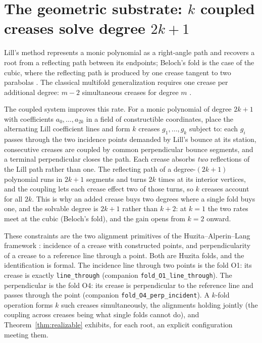 \documentclass[11pt]{amsart}
\theoremstyle{plain}
\theoremstyle{definition}
\newcommand{\code}[1]{\texttt{#1}}
\begin{document}
\section{The geometric substrate: $k$ coupled creases solve degree $2k+1$}\label{sec:geom}

Lill's method represents a monic polynomial as a right-angle path and recovers a root from a reflecting path between its endpoints; Beloch's fold is the case of the cubic, where the reflecting path is produced by one crease tangent to two parabolas \cite{hull}. The classical multifold generalization requires one crease per additional degree: $m-2$ simultaneous creases for degree $m$ \cite{alperinlang, lucero}.

The coupled system improves this rate. For a monic polynomial of degree $2k+1$ with coefficients $a_0,\dots,a_{2k}$ in a field of constructible coordinates, place the alternating Lill coefficient lines and form $k$ creases $g_1,\dots,g_k$ subject to: each $g_i$ passes through the two incidence points demanded by Lill's bounce at its station, consecutive creases are coupled by common perpendicular bounce segments, and a terminal perpendicular closes the path. Each crease absorbs \emph{two} reflections of the Lill path rather than one. The reflecting path of a degree-$(2k+1)$ polynomial runs in $2k+1$ segments and turns $2k$ times at its interior vertices, and the coupling lets each crease effect two of those turns, so $k$ creases account for all $2k$. This is why an added crease buys two degrees where a single fold buys one, and the solvable degree is $2k+1$ rather than $k+2$: at $k=1$ the two rates meet at the cubic (Beloch's fold), and the gain opens from $k=2$ onward.

These constraints are the two alignment primitives of the Huzita--Alperin--Lang framework \cite{alperinlang, hull}: incidence of a crease with constructed points, and perpendicularity of a crease to a reference line through a point. Both are Huzita folds, and the identification is formal. The incidence line through two points is the fold O1: its crease is exactly \code{line\_through} (companion \code{fold\_O1\_line\_through}). The perpendicular is the fold O4: its crease is perpendicular to the reference line and passes through the point (companion \code{fold\_O4\_perp\_incident}). A $k$-fold operation forms $k$ such creases simultaneously, the alignments holding jointly (the coupling across creases being what single folds cannot do), and Theorem~\ref{thm:realizable} exhibits, for each root, an explicit configuration meeting them.
\end{document}
